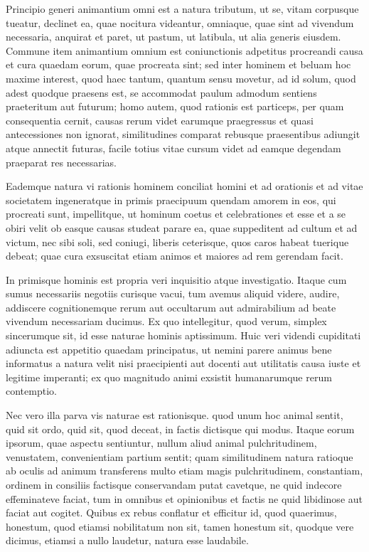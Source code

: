  Principio generi animantium omni est a natura tributum, ut se, vitam corpusque tueatur, declinet ea, quae nocitura videantur, omniaque, quae sint ad vivendum necessaria, anquirat et paret, ut pastum, ut latibula, ut alia generis eiusdem. Commune item animantium omnium est coniunctionis adpetitus procreandi causa et cura quaedam eorum, quae procreata sint; sed inter hominem et beluam hoc maxime interest, quod haec tantum, quantum sensu movetur, ad id solum, quod adest quodque praesens est, se accommodat paulum admodum sentiens praeteritum aut futurum; homo autem, quod rationis est particeps, per quam consequentia cernit, causas rerum videt earumque praegressus et quasi antecessiones non ignorat, similitudines comparat rebusque praesentibus adiungit atque annectit futuras, facile totius vitae cursum videt ad eamque degendam praeparat res necessarias.

 Eademque natura vi rationis hominem conciliat homini et ad orationis et ad vitae societatem ingeneratque in primis praecipuum quendam amorem in eos, qui procreati sunt, impellitque, ut hominum coetus et celebrationes et esse et a se obiri velit ob easque causas studeat parare ea, quae suppeditent ad cultum et ad victum, nec sibi soli, sed coniugi, liberis ceterisque, quos caros habeat tuerique debeat; quae cura exsuscitat etiam animos et maiores ad rem gerendam facit.

 In primisque hominis est propria veri inquisitio atque investigatio. Itaque cum sumus necessariis negotiis curisque vacui, tum avemus aliquid videre, audire, addiscere cognitionemque rerum aut occultarum aut admirabilium ad beate vivendum necessariam ducimus. Ex quo intellegitur, quod verum, simplex sincerumque sit, id esse naturae hominis aptissimum. Huic veri videndi cupiditati adiuncta est appetitio quaedam principatus, ut nemini parere animus bene informatus a natura velit nisi praecipienti aut docenti aut utilitatis causa iuste et legitime imperanti; ex quo magnitudo animi exsistit humanarumque rerum contemptio.

 Nec vero illa parva vis naturae est rationisque. quod unum hoc animal sentit, quid sit ordo, quid sit, quod deceat, in factis dictisque qui modus. Itaque eorum ipsorum, quae aspectu sentiuntur, nullum aliud animal pulchritudinem, venustatem, convenientiam partium sentit; quam similitudinem natura ratioque ab oculis ad animum transferens multo etiam magis pulchritudinem, constantiam, ordinem in consiliis factisque conservandam putat cavetque, ne quid indecore effeminateve faciat, tum in omnibus et opinionibus et factis ne quid libidinose aut faciat aut cogitet. Quibus ex rebus conflatur et efficitur id, quod quaerimus, honestum, quod etiamsi nobilitatum non sit, tamen honestum sit, quodque vere dicimus, etiamsi a nullo laudetur, natura esse laudabile.

